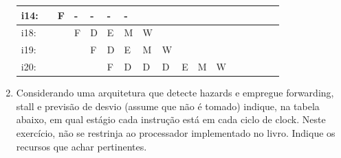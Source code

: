 \documentclass{article}
\begin{document}
\begin{enumerate}
\begin{table}[H]
\begin{tabular}{|l|l|l|l|l|l|l|l|l|l|l|l|l|l|l|l|l|}
i14: &     &  F  &  -  &  -  &  -  &  -  &     &     &     &     &     &     &     &     &     &     \\ \hline
i18: &     &     &  F  &  D  &  E  &  M  &  W  &     &     &     &     &     &     &     &     &     \\ \hline
i19: &     &     &     &  F  &  D  &  E  &  M  &  W  &     &     &     &     &     &     &     &     \\ \hline
i20: &     &     &     &     &  F  &  D  &  D  &  D  &  E  &  M  &  W  &     &     &     &     &     \\ \hline
\end{tabular}
\end{table}

\pagebreak

\item Considerando uma arquitetura que detecte hazards e empregue forwarding, stall e previsão de desvio (assume que não é tomado) indique, na tabela abaixo, em qual estágio cada instrução está em cada ciclo de clock. Neste exercício, não se restrinja ao processador implementado no livro. Indique os recursos que achar pertinentes.


\end{enumerate}
\end{document}
